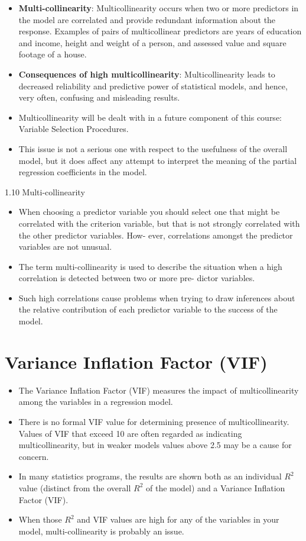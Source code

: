 \documentclass[]{report}
\begin{document}
\begin{itemize}
	\item \textbf{Multi-collinearity}: Multicollinearity occurs when two or more predictors in the model are
	correlated and provide redundant information about the response. Examples of pairs of multicollinear predictors are years of education and income, height and weight of a person, and assessed value and square footage
	of a house.
	
	\item \textbf{Consequences of high multicollinearity}:
	Multicollinearity leads to decreased reliability and predictive power of statistical models, and hence, very often, confusing and misleading results.
	\item Multicollinearity will be dealt with in a future component of this course: Variable Selection Procedures.
	\item This issue is not a serious one with respect to the
	usefulness of the overall model, but it does affect any attempt to interpret the meaning of the partial regression
	coefficients in the model.
\end{itemize}

1.10 Multi-collinearity
\begin{itemize}
	\item When choosing a predictor variable you should select one that might be correlated with the
	criterion variable, but that is not strongly correlated with the other predictor variables. How-
	ever, correlations amongst the predictor variables are not unusual.
	\item  The term multi-collinearity
	is used to describe the situation when a high correlation is detected between two or more pre-
	dictor variables. 
	\item Such high correlations cause problems when trying to draw inferences about
	the relative contribution of each predictor variable to the success of the model.
\end{itemize}

\section*{Variance Inflation Factor (VIF)}
\begin{itemize}
	\item The Variance Inflation Factor (VIF) measures the impact of multicollinearity among the variables in a regression model.
	\item There is no formal VIF value for determining presence of multicollinearity. Values of VIF
	that exceed 10 are often regarded as indicating multicollinearity, but in weaker models values
	above 2.5 may be a cause for concern. 
	\item In many statistics programs, the results are shown both
	as an individual $R^2$ value (distinct from the overall $R^2$ of the model) and a Variance Inflation
	Factor (VIF). 
	\item When those $R^2$ and VIF values are high for any of the variables in your model,
	multi-collinearity is probably an issue.
	
\end{itemize}
\end{document}
